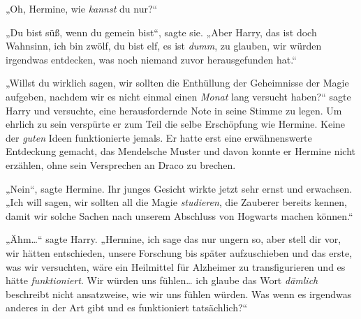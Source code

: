 „Oh, Hermine, wie \emph{kannst} du nur?“

„Du bist süß, wenn du gemein bist“, sagte sie. „Aber Harry, das ist doch Wahnsinn, ich bin zwölf, du bist elf, es ist \emph{dumm}, zu glauben, wir würden irgendwas entdecken, was noch niemand zuvor herausgefunden hat.“

„Willst du wirklich sagen, wir sollten die Enthüllung der Geheimnisse der Magie aufgeben, nachdem wir es nicht einmal einen \emph{Monat} lang versucht haben?“ sagte Harry und versuchte, eine herausfordernde Note in seine Stimme zu legen. Um ehrlich zu sein verspürte er zum Teil die selbe Erschöpfung wie Hermine. Keine der \emph{guten} Ideen funktionierte jemals. Er hatte erst eine erwähnenswerte Entdeckung gemacht, das Mendelsche Muster und davon konnte er Hermine nicht erzählen, ohne sein Versprechen an Draco zu brechen.

„Nein“, sagte Hermine. Ihr junges Gesicht wirkte jetzt sehr ernst und erwachsen. „Ich will sagen, wir sollten all die Magie \emph{studieren}, die Zauberer bereits kennen, damit wir solche Sachen nach unserem Abschluss von Hogwarts machen können.“

„Ähm…“ sagte Harry. „Hermine, ich sage das nur ungern so, aber stell dir vor, wir hätten entschieden, unsere Forschung bis später aufzuschieben und das erste, was wir versuchten, wäre ein Heilmittel für Alzheimer zu transfigurieren und es hätte \emph{funktioniert}. Wir würden uns fühlen… ich glaube das Wort \emph{dämlich} beschreibt nicht ansatzweise, wie wir uns fühlen würden. Was wenn es irgendwas anderes in der Art gibt und es funktioniert tatsächlich?“


